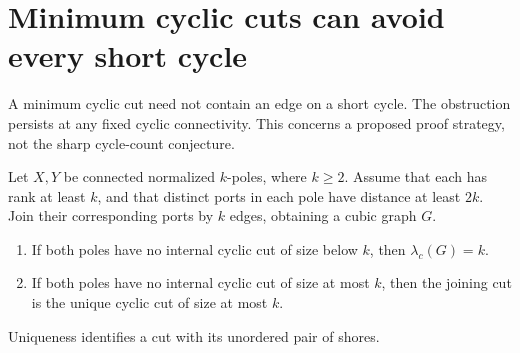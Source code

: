 \section{Minimum cyclic cuts can avoid every short cycle}
\label{sec:random-long-minimum-cut}

A minimum cyclic cut need not contain an edge on a short cycle.
The obstruction persists at any fixed cyclic connectivity.
This concerns a proposed proof strategy, not the sharp cycle-count conjecture.

\begin{lemma}
\label{lem:random-distant-port-gluing}
Let $X,Y$ be connected normalized $k$-poles, where $k\ge2$.
Assume that each has rank at least $k$, and that distinct ports in each pole have distance at least $2k$.
Join their corresponding ports by $k$ edges, obtaining a cubic graph $G$.
\begin{enumerate}
\item If both poles have no internal cyclic cut of size below $k$, then $\lambda_c(G)=k$.
\item If both poles have no internal cyclic cut of size at most $k$, then the joining cut is the unique cyclic cut of size at most $k$.
\end{enumerate}
Uniqueness identifies a cut with its unordered pair of shores.
\end{lemma}

